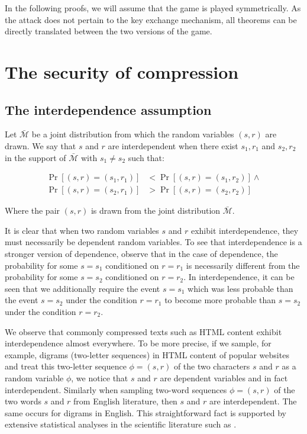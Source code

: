 \documentclass[conference, letterpaper, 10pt]{IEEEtran}
\begin{document}
In the following proofs, we will assume that the game is played symmetrically.
As the attack does not pertain to the key exchange mechanism, all theorems can
be directly translated between the two versions of the game.

\section{The security of compression}\label{sec:comsec}

\subsection{The interdependence assumption}\label{subsec:interdependence}

Let $\bar{\mathcal{M}}$ be a joint distribution from which the random variables
$(s, r)$ are drawn. We say that $s$ and $r$ are interdependent when there exist
$s_1, r_1$ and $s_2, r_2$ in the support of $\bar{\mathcal{M}}$ with $s_1 \neq
s_2$ such that:

\begin{align*}
    \Pr[(s, r) = (s_1, r_1)] &< \Pr[(s, r) = (s_1, r_2)]
\land\\
    \Pr[(s, r) = (s_2, r_1)] &> \Pr[(s, r) = (s_2, r_2)]
\end{align*}

Where the pair $(s, r)$ is drawn from the joint distribution
$\bar{\mathcal{M}}$.

It is clear that when two random variables $s$ and $r$ exhibit interdependence,
they must necessarily be dependent random variables. To see that
interdependence is a stronger version of dependence, observe that in the case
of dependence, the probability for some $s = s_1$ conditioned on $r = r_1$ is
necessarily different from the probability for some $s = s_2$ conditioned on $r
= r_2$. In interdependence, it can be seen that we additionally require the
event $s = s_1$ which was less probable than the event $s = s_2$ under the
condition $r = r_1$ to become more probable than $s = s_2$ under the condition
$r = r_2$.

We observe that commonly compressed texts such as HTML content exhibit
interdependence almost everywhere. To be more precise, if we sample, for
example, digrams (two-letter sequences) in HTML content of popular websites and
treat this two-letter sequence $\phi = (s, r)$ of the two characters $s$ and
$r$ as a random variable $\phi$, we notice that $s$ and $r$ are dependent
variables and in fact interdependent. Similarly when sampling two-word sequences
$\phi = (s, r)$ of the two words $s$ and $r$ from English literature, then $s$
and $r$ are interdependent. The same occurs for digrams in English. This
straightforward fact is supported by extensive statistical analyses in the
scientific literature such as \cite{c6}.
\end{document}
